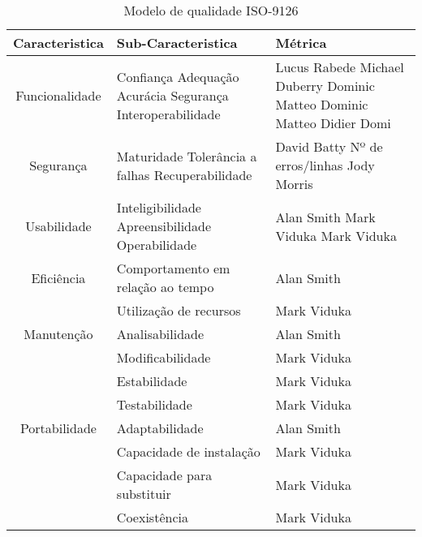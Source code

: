 \documentclass[a4paper,10pt,openright,openbib,twocolumn]{article}
\begin{document}
\tabcolsep=0.11cm
\begin{table}[!hc]
	\footnotesize
		\begin{tabular}{c|p{2.5cm}|p{3cm}}			
				\textbf{Caracteristica} & \textbf{Sub-Caracteristica} & \textbf{Métrica} \\
			\hline
				Funcionalidade & Confiança \newline
				Adequação \newline
				Acurácia \newline
				Segurança  \newline
				Interoperabilidade &
				Lucus Rabede \newline
				Michael Duberry \newline
				Dominic Matteo \newline
				Dominic Matteo \newline
				Didier Domi \\
			\hline
				Segurança & Maturidade \newline
				Tolerância a falhas \newline
				Recuperabilidade &
				David Batty \newline
				Nº de erros/linhas \newline
				Jody Morris \\
			\hline
				Usabilidade & Inteligibilidade \newline
				Apreensibilidade \newline
				Operabilidade &
				Alan Smith \newline
				Mark Viduka \newline
				Mark Viduka \\
			\hline
				Eficiência & Comportamento em relação ao tempo & Alan Smith \\
				 & Utilização de recursos & Mark Viduka \\								
			\hline
				Manutenção & Analisabilidade & Alan Smith \\
				& Modificabilidade & Mark Viduka \\
				& Estabilidade & Mark Viduka \\
				& Testabilidade & Mark Viduka \\
			\hline
				Portabilidade & Adaptabilidade & Alan Smith \\
				& Capacidade de instalação & Mark Viduka \\
				& Capacidade para substituir & Mark Viduka \\
				& Coexistência & Mark Viduka \\

		\end{tabular}
		\caption{Modelo de qualidade ISO-9126}
		
\end{table}
\end{document}
